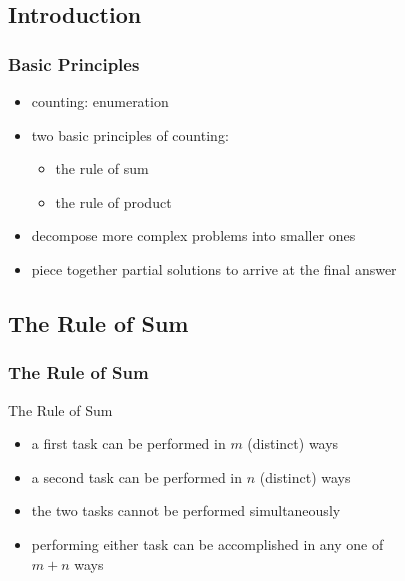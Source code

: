 \documentclass[dvipsnames]{beamer}
\begin{document}
\subsection{Introduction}

\begin{frame}
  \frametitle{Basic Principles}

  \begin{itemize}
    \item counting: enumeration

    \medskip
    \item two basic principles of counting:
    \begin{itemize}
      \item the rule of sum
      \item the rule of product
    \end{itemize}

    \medskip
    \item decompose more complex problems into smaller ones
    \item piece together partial solutions to arrive at the final answer
  \end{itemize}
\end{frame}

\subsection{The Rule of Sum}

\begin{frame}
  \frametitle{The Rule of Sum}

  \begin{block}{The Rule of Sum}
    \begin{itemize}
      \item a first task can be performed in $m$ (distinct) ways
      \item a second task can be performed in $n$ (distinct) ways
      \item the two tasks cannot be performed simultaneously

      \pause
      \medskip
      \item performing either task can be accomplished in any one of\\
        $m+n$ ways
    \end{itemize}
  \end{block}
\end{frame}
\end{document}
